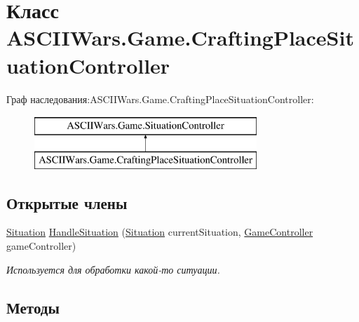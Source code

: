 \hypertarget{class_a_s_c_i_i_wars_1_1_game_1_1_crafting_place_situation_controller}{}\section{Класс A\+S\+C\+I\+I\+Wars.\+Game.\+Crafting\+Place\+Situation\+Controller}
\label{class_a_s_c_i_i_wars_1_1_game_1_1_crafting_place_situation_controller}
Граф наследования\+:A\+S\+C\+I\+I\+Wars.\+Game.\+Crafting\+Place\+Situation\+Controller\+:\begin{figure}[H]
\begin{center}
\leavevmode
\includegraphics[height=2.000000cm]{class_a_s_c_i_i_wars_1_1_game_1_1_crafting_place_situation_controller}
\end{center}
\end{figure}
\subsection*{Открытые члены}
\begin{DoxyCompactItemize}
\item 
\hyperlink{class_a_s_c_i_i_wars_1_1_game_1_1_situation}{Situation} \hyperlink{class_a_s_c_i_i_wars_1_1_game_1_1_crafting_place_situation_controller_a7e9f8549aa179c520a21039882cea3d7}{Handle\+Situation} (\hyperlink{class_a_s_c_i_i_wars_1_1_game_1_1_situation}{Situation} current\+Situation, \hyperlink{class_a_s_c_i_i_wars_1_1_game_1_1_game_controller}{Game\+Controller} game\+Controller)
\begin{DoxyCompactList}\small\item\em Используется для обработки какой-\/то ситуации. \end{DoxyCompactList}\end{DoxyCompactItemize}


\subsection{Методы}
\hypertarget{class_a_s_c_i_i_wars_1_1_game_1_1_crafting_place_situation_controller_a7e9f8549aa179c520a21039882cea3d7}{}\label{class_a_s_c_i_i_wars_1_1_game_1_1_crafting_place_situation_controller_a7e9f8549aa179c520a21039882cea3d7} 
